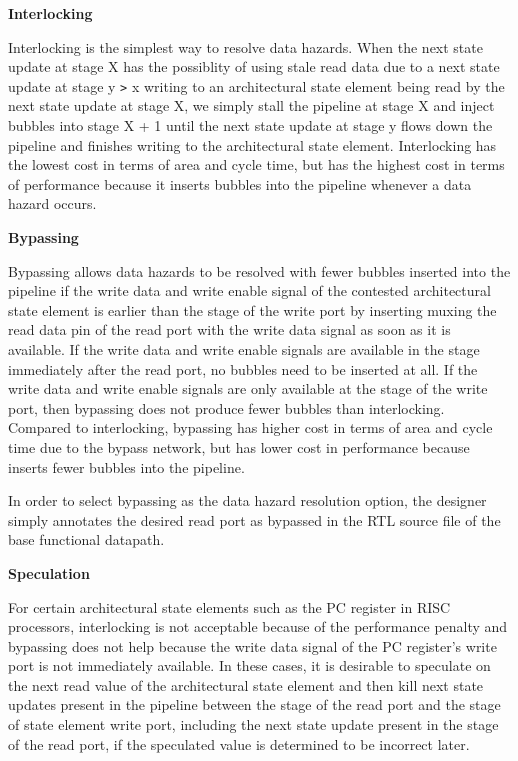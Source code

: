 {\bf Interlocking}

Interlocking is the simplest way to resolve data hazards. When the next state update at stage X has the possiblity of using stale read data due to a next state update at stage y {\tt >} x writing to an architectural state element being read by the next state update at stage X, we simply stall the pipeline at stage X and inject bubbles into stage X + 1 until the next state update at stage y flows down the pipeline and finishes writing to the architectural state element. Interlocking has the lowest cost in terms of area and cycle time, but has the highest cost in terms of performance because it inserts bubbles into the pipeline whenever a data hazard occurs.

{\bf Bypassing}

Bypassing allows data hazards to be resolved with fewer bubbles inserted into the pipeline if the write data and write enable signal of the contested architectural state element is earlier than the stage of the write port by inserting muxing the read data pin of the read port with the write data signal as soon as it is available. If the write data and write enable signals are available in the stage immediately after the read port, no bubbles need to be inserted at all. If the write data and write enable signals are only available at the stage of the write port, then bypassing does not produce fewer bubbles than interlocking. Compared to interlocking, bypassing has higher cost in terms of area and cycle time due to the bypass network, but has lower cost in performance because inserts fewer bubbles into the pipeline.

In order to select bypassing as the data hazard resolution option, the designer simply annotates the desired read port as bypassed in the RTL source file of the base functional datapath.

{\bf Speculation}

For certain architectural state elements such as the PC register in RISC processors, interlocking is not acceptable because of the performance penalty and bypassing does not help because the write data signal of the PC register's write port is not immediately available. In these cases, it is desirable to speculate on the next read value of the architectural state element and then kill next state updates present in the pipeline between the stage of the read port and the stage of state element write port, including the next state update present in the stage of the read port, if the speculated value is determined to be incorrect later.

